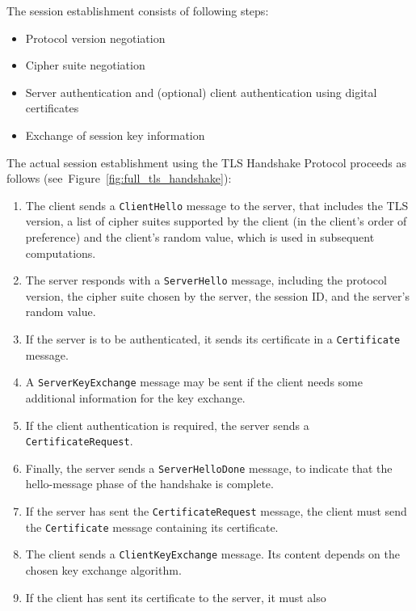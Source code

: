     \noindent The session establishment consists of following steps:
    \begin{itemize}
        \item Protocol version negotiation
        \item Cipher suite negotiation
        \item Server authentication and (optional) client authentication using
              digital certificates
        \item Exchange of session key information
    \end{itemize}

    \noindent The actual session establishment using the TLS Handshake Protocol
    proceeds as follows (see~Figure~\ref{fig:full_tls_handshake}):
    \begin{enumerate}
        \item The client sends a \texttt{ClientHello} message to the server, that
              includes the TLS version, a list of cipher suites supported by the
              client (in the client's order of preference) and the client's
              random value, which is used in subsequent computations.
        \item The server responds with a \texttt{ServerHello} message, including
              the protocol version, the cipher suite chosen by the server, the session ID,
              and the server's random value.
        \item If the server is to be authenticated, it sends its certificate in
              a \texttt{Certificate} message.
        \item A \texttt{ServerKeyExchange} message may be sent if the client
              needs some additional information for the key exchange.
        \item If the client authentication is required, the server sends a
              \texttt{CertificateRequest}.
        \item Finally, the server sends a \texttt{ServerHelloDone} message, to
              indicate that the hello-message phase of the handshake is complete.
        \item If the server has sent the \texttt{CertificateRequest} message, the
              client must send the \texttt{Certificate} message containing its
              certificate.
        \item The client sends a \texttt{ClientKeyExchange} message. Its content
              depends on the chosen key exchange algorithm.
        \item If the client has sent its certificate to the server, it must also

\end{enumerate}
